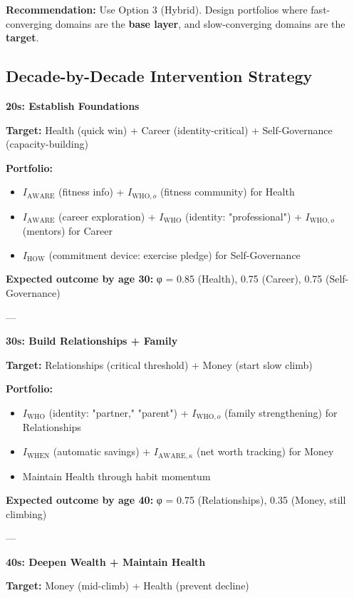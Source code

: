 {{{\textbf{Recommendation:} Use Option 3 (Hybrid). Design portfolios where fast-converging domains are the \textbf{base layer}, and slow-converging domains are the \textbf{target}.

\subsection{Decade-by-Decade Intervention Strategy}

\textbf{20s: Establish Foundations}

\textbf{Target:} Health (quick win) + Career (identity-critical) + Self-Governance (capacity-building)

\textbf{Portfolio:}
\begin{itemize}[nosep]
\item $I_{\text{AWARE}}$ (fitness info) + $I_{\text{WHO},o}$ (fitness community) for Health
\item $I_{\text{AWARE}}$ (career exploration) + $I_{\text{WHO}}$ (identity: "professional") + $I_{\text{WHO},o}$ (mentors) for Career
\item $I_{\text{HOW}}$ (commitment device: exercise pledge) for Self-Governance
\end{itemize}

\textbf{Expected outcome by age 30:} φ = 0.85 (Health), 0.75 (Career), 0.75 (Self-Governance)

---

\textbf{30s: Build Relationships + Family}

\textbf{Target:} Relationships (critical threshold) + Money (start slow climb)

\textbf{Portfolio:}
\begin{itemize}[nosep]
\item $I_{\text{WHO}}$ (identity: "partner," "parent") + $I_{\text{WHO},o}$ (family strengthening) for Relationships
\item $I_{\text{WHEN}}$ (automatic savings) + $I_{\text{AWARE},\kappa}$ (net worth tracking) for Money
\item Maintain Health through habit momentum
\end{itemize}

\textbf{Expected outcome by age 40:} φ = 0.75 (Relationships), 0.35 (Money, still climbing)

---

\textbf{40s: Deepen Wealth + Maintain Health}

\textbf{Target:} Money (mid-climb) + Health (prevent decline)

}}}
